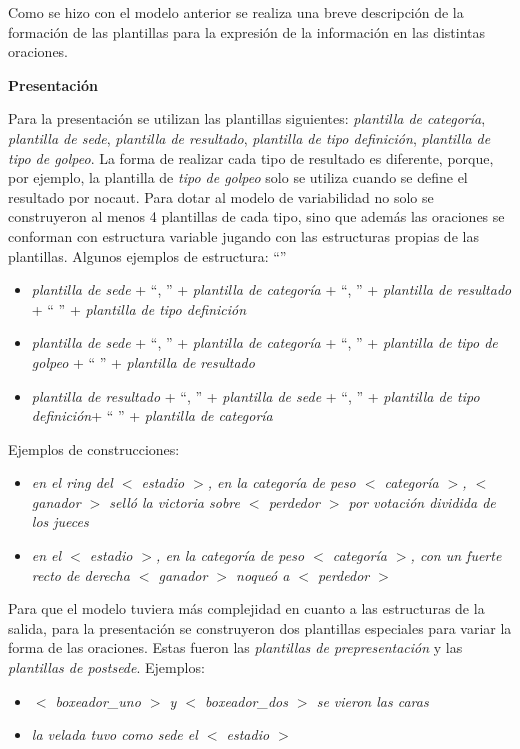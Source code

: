     Como se hizo con el modelo anterior se realiza una breve descripción de la formación de las plantillas para 
la expresión de la información en las distintas oraciones.

    \textbf{Presentación}

    Para la presentación se utilizan las plantillas siguientes: \textit{plantilla de categoría}, \textit{plantilla de sede}, 
\textit{plantilla de resultado}, \textit{plantilla de tipo definición}, \textit{plantilla de tipo de golpeo}. La forma de realizar cada tipo de resultado es diferente, porque, 
por ejemplo, la plantilla de \textit{tipo de golpeo} solo se utiliza cuando se define el resultado por nocaut. Para dotar 
al modelo de variabilidad no solo se construyeron al menos 4 plantillas de cada tipo, sino que además las oraciones se conforman 
con estructura variable jugando con las estructuras propias de las plantillas.
    Algunos ejemplos de estructura:  “”
    \begin{itemize}
        \item \textit{plantilla de sede} + “, ” + \textit{plantilla de categoría} + “, ” + \textit{plantilla de resultado} + “ ” + \textit{plantilla de tipo definición}
        \item \textit{plantilla de sede} + “, ” + \textit{plantilla de categoría} + “, ” + \textit{plantilla de tipo de golpeo} + “ ” + \textit{plantilla de resultado}
        \item \textit{plantilla de resultado} + “, ” + \textit{plantilla de sede} + “, ” + \textit{plantilla de tipo definición}+ “ ” + \textit{plantilla de categoría}
    \end{itemize}

    Ejemplos de construcciones:
    \begin{itemize}
        \item \textit{ en el ring del $<$ estadio $>$, en la categoría de peso $<$ categoría $>$, $<$ ganador $>$ selló la victoria 
        sobre $<$ perdedor $>$ por votación dividida de los jueces}
        \item \textit{ en el $<$ estadio $>$, en la categoría de peso $<$ categoría $>$, con un fuerte recto de derecha $<$ ganador $>$ noqueó a $<$ perdedor $>$}
    \end{itemize}

    Para que el modelo tuviera más complejidad en cuanto a las estructuras de la salida, para la presentación se construyeron dos 
plantillas especiales para variar la forma de las oraciones. Estas fueron las \textit{plantillas de prepresentación} y las 
\textit{plantillas de postsede}.
    Ejemplos:
    \begin{itemize}
        \item \textit{$<$ boxeador\_uno $>$ y $<$ boxeador\_dos $>$ se vieron las caras}
        \item \textit{la velada tuvo como sede el $<$ estadio $>$}
    \end{itemize}

